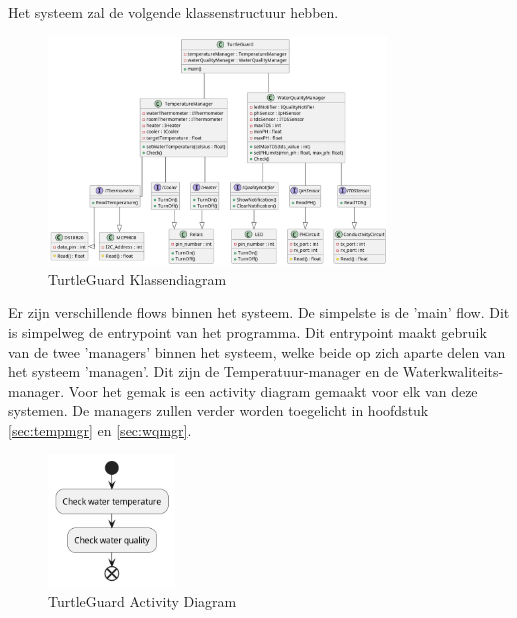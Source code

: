\documentclass[a4paper]{report}
\newcommand{\turtleguard}{\mbox{TurtleGuard\texttrademark}\xspace}
\begin{document}
Het systeem zal de volgende klassenstructuur hebben.
\begin{figure}[h]
  \centering
  \includegraphics[width=0.8\textwidth]{Images/classdiagram.png}
  \caption{\turtleguard Klassendiagram}
  \label{fig:classdiagram}
\end{figure}

\par \smallskip
Er zijn verschillende flows binnen het systeem. De simpelste is de 'main' flow. Dit is simpelweg de entrypoint van het programma.
Dit entrypoint maakt gebruik van de twee 'managers' binnen het systeem, welke beide op zich aparte delen van het systeem 'managen'.
Dit zijn de Temperatuur-manager en de Waterkwaliteits-manager. 
Voor het gemak is een activity diagram gemaakt voor elk van deze systemen. De managers zullen verder worden toegelicht in hoofdstuk \ref{sec:tempmgr} en \ref{sec:wqmgr}. 


\begin{figure}[H]
  \centering
  \includegraphics[width=0.3\textwidth]{Images/ActivityDiagram.png}
  \caption{\turtleguard Activity Diagram}
  \label{fig:activitydiagram}
\end{figure}
\end{document}
